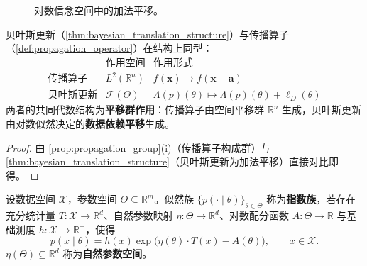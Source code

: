 \begin{figure}[htbp]
\centering
{}
\caption{对数信念空间中的加法平移。}
\label{fig:bayesian_translation}
\end{figure}

\begin{corollary}[贝叶斯更新与传播算子的结构同型]\label{cor:bayesian_propagation_isomorphism}
贝叶斯更新（\cref{thm:bayesian_translation_structure}）与传播算子（\cref{def:propagation_operator}）在结构上同型：
\[
\begin{array}{c|c|c}
& \text{作用空间} & \text{作用形式} \\ \hline
\text{传播算子} & L^2(\mathbb{R}^n) & f(\mathbf{x})\mapsto f(\mathbf{x}-\mathbf{a}) \\
\text{贝叶斯更新} & \mathcal{F}(\Theta) & \Lambda(p)(\theta)\mapsto \Lambda(p)(\theta)+\ell_D(\theta)
\end{array}
\]
两者的共同代数结构为\textbf{平移群作用}：传播算子由空间平移群 $\mathbb{R}^n$ 生成，贝叶斯更新由对数似然决定的\textbf{数据依赖平移}生成。
\end{corollary}

\begin{proof}
由 \cref{prop:propagation_group}(i)（传播算子构成群）与 \cref{thm:bayesian_translation_structure}（贝叶斯更新为加法平移）直接对比即得。
\end{proof}

\begin{definition}[指数族与自然参数]\label{def:exponential_family}
设数据空间 $\mathcal{X}$，参数空间 $\Theta\subseteq\mathbb{R}^m$。似然族 $\{p(\cdot\mid\theta)\}_{\theta\in\Theta}$ 称为\textbf{指数族}，若存在充分统计量 $T:\mathcal{X}\to\mathbb{R}^d$、自然参数映射 $\eta:\Theta\to\mathbb{R}^d$、对数配分函数 $A:\Theta\to\mathbb{R}$ 与基础测度 $h:\mathcal{X}\to\mathbb{R}^+$，使得
\[
p(x\mid\theta) = h(x)\exp\bigl(\eta(\theta)\cdot T(x) - A(\theta)\bigr), \qquad x\in\mathcal{X}.
\]
$\eta(\Theta)\subseteq\mathbb{R}^d$ 称为\textbf{自然参数空间}。
\end{definition}

